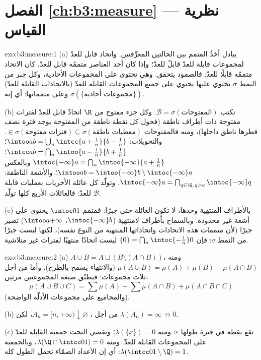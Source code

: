 \section*{الفصل \ref{ch:b3:measure} --- نظرية القياس}

\begin{solution}{exo:b3:measure:1}
(a) يبادل أخذُ المتمم بين الحالتين المعرِّفتين. واتحاد قابل للعدّ
لمجموعات قابلة للعدّ قابلٌ للعدّ؛ وإذا كان أحد العناصر متممُه قابل للعدّ، كان
الاتحاد متممُه قابلًا للعدّ: فالصمود يتحقق. وهي تحتوي على المجموعات
الأحادية، وكل جبر من النمط $\sigma$ يحتوي عليها يحتوي على جميع
المجموعات القابلة للعدّ (بالاتحادات القابلة للعدّ) وعلى متمماتها: أي إنه
$\sigma(\{\text{مجموعات أحادية}\})$.

(b) نكتب $\mathcal B = \sigma(\text{المفتوحات})$. وكل جزء مفتوح من $\R$ اتحادٌ قابل للعدّ لفترات
مفتوحة ذات أطراف ناطقة (فحول كل نقطة ناطقة من المفتوحة يوجد
فترة نصف قطرها ناطق داخلها)، ومنه فالمفتوحات $\in
\sigma(\text{فترات مفتوحة}) \subseteq \sigma(\text{معطيات ناطقة})$. والتحويلات:
$\intoo ab = \bigcup_n\intcc{a +
\frac1n}{b - \frac1n}$؛ $\intcc ab = \bigcap_n \intoo{a -
\frac1n}{b + \frac1n}$؛ $\intoc{-\infty}a = \bigcap_n
\intoo{-\infty}{a + \frac1n}$ وبالعكس $\intoo ab =
\intoo{-\infty}b \setminus \intoc{-\infty}a$؛ والأشعة الناطقة: $\intoc{-\infty}a =
\bigcap_{q \in \Q,\, q > a}\intoc{-\infty}q$.
وتولّد كل عائلة الأخريات بعمليات قابلة للعدّ: فالعائلات الأربع كلها
تولّد $\mathcal B$.

(c) بالأطراف المنتهية وحدها، لا تكون العائلة حتى جبرًا: فمتمم
$\intoc01$ يحتوي على أشعة غير محدودة. وبالسماح بأطراف لامنتهية
($\intoc{-\infty}b$، $\intoo
a{+\infty}$) تصير جبرًا (لأن متممات هذه الاتحادات
واتحاداتها المنتهية من النوع نفسه)، لكنها ليست جبرًا من النمط
$\sigma$: فإن $\{0\} = \bigcap_n\intoc{-\frac1n}0$ ليست اتحادًا منتهيًا لفترات غير متلاشية.
\end{solution}

\begin{solution}{exo:b3:measure:2}
(a) $A \cup B = A \sqcup (B \setminus (A\cap B))$، ومنه $\mu(A\cup B) = \mu(A) + \mu(B) - \mu(A\cap B)$ (والانتهاء يسمح بالطرح). وأما من أجل
ثلاث مجموعات: فنطبّق صيغة المجموعتين مرتين،
\[
\mu(A\cup B\cup C) = \sum\mu(A) - \sum\mu(A\cap B) +
\mu(A\cap B\cap C)
\]
(والمجاميع على مجموعات الأدلّة الواضحة).

(b) من أجل ، $A_n = [n, +\infty) \downarrow
\varnothing$، لكن $\lambda(A_n) = \infty \not\to 0$.

(c) تقع نقطة في فترة طولها $\varepsilon$: ومنه $\lambda(\{x\}) = 0$؛ وتقضي
التحت جمعية القابلة للعدّ على المجموعات القابلة للعدّ. ومنه $\lambda(\Q \cap \intcc01) = 0$،
وبالجمعية $\lambda(\intcc01\setminus\Q) = 1$: أي إن الأعداد الصمّاء تحمل الطول كله.
\end{solution}

